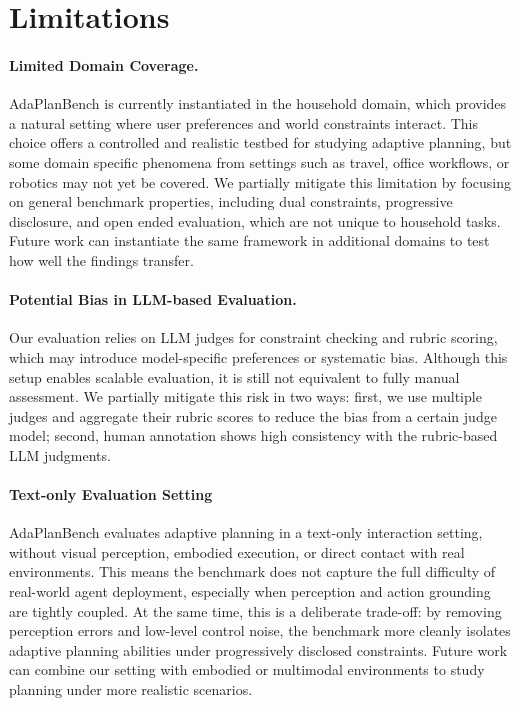 \documentclass{llmxive}
\begin{document}
\section{Limitations}

\paragraph{Limited Domain Coverage.}
AdaPlanBench is currently instantiated in the household domain, which provides a natural setting where user preferences and world constraints interact. This choice offers a controlled and realistic testbed for studying adaptive planning, but some domain specific phenomena from settings such as travel, office workflows, or robotics may not yet be covered. We partially mitigate this limitation by focusing on general benchmark properties, including dual constraints, progressive disclosure, and open ended evaluation, which are not unique to household tasks. Future work can instantiate the same framework in additional domains to test how well the findings transfer.

\paragraph{Potential Bias in LLM-based Evaluation.}
Our evaluation relies on LLM judges for constraint checking and rubric scoring, which may introduce model-specific preferences or systematic bias. Although this setup enables scalable evaluation, it is still not equivalent to fully manual assessment. We partially mitigate this risk in two ways: first, we use multiple judges and aggregate their rubric scores to reduce the bias from a certain judge model; second, human annotation shows high consistency with the rubric-based LLM judgments. 

\paragraph{Text-only Evaluation Setting}
AdaPlanBench evaluates adaptive planning in a text-only interaction setting, without visual perception, embodied execution, or direct contact with real environments. This means the benchmark does not capture the full difficulty of real-world agent deployment, especially when perception and action grounding are tightly coupled. At the same time, this is a deliberate trade-off: by removing perception errors and low-level control noise, the benchmark more cleanly isolates adaptive planning abilities under progressively disclosed constraints. Future work can combine our setting with embodied or multimodal environments to study planning under more realistic scenarios.
\end{document}
